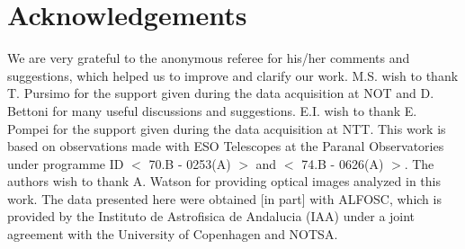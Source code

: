 \documentclass[useAMS,usenatbib]{mn2e}
\begin{document}
\section*{Acknowledgements}
We are very grateful to the anonymous referee for his/her comments and
suggestions, which helped us to improve and clarify our work.
M.S. wish to thank T. Pursimo for the support given during the data
acquisition at NOT and D. Bettoni for many useful discussions and
suggestions.  E.I. wish to thank E. Pompei for the support given
during the data acquisition at NTT. This work is based on observations
made with ESO Telescopes at the Paranal Observatories under programme
ID $<$ 70.B - 0253(A) $>$ and $<$ 74.B - 0626(A) $>$. The authors wish
to thank A. Watson for providing optical images analyzed in this
work. The data presented here were obtained [in part] with ALFOSC,
which is provided by the Instituto de Astrofisica de Andalucia (IAA)
under a joint agreement with the University of Copenhagen and NOTSA.



\bsp

\label{lastpage}
\end{document}
